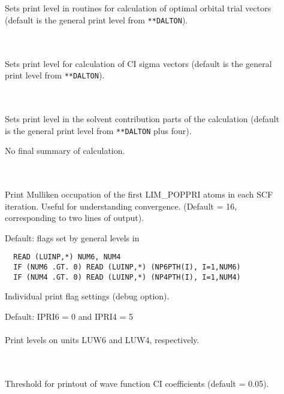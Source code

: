 \begin{description}
\item[] \ \\
   \\
  Sets print level in routines for calculation of optimal orbital trial vectors
  (default is the general print level from \verb|**DALTON|).

\item[] \ \\
   \\
  Sets print level for calculation of CI sigma vectors
  (default is the general print level from \verb|**DALTON|).

\item[] \ \\
   \\
  Sets print level in the solvent contribution parts of the calculation
  (default is the general print level from \verb|**DALTON| plus four).

\item[]
  No final summary of calculation.

\item[] \ \\
   \\
  Print Mulliken occupation of the first LIM\_POPPRI atoms in
  each SCF iteration. Useful for understanding convergence.
  (Default = 16, corresponding to two lines of output).

\item[]
 Default: flags set by general levels in 
\begin{verbatim}
  READ (LUINP,*) NUM6, NUM4
  IF (NUM6 .GT. 0) READ (LUINP,*) (NP6PTH(I), I=1,NUM6)
  IF (NUM4 .GT. 0) READ (LUINP,*) (NP4PTH(I), I=1,NUM4)
\end{verbatim}
  Individual print flag settings (debug option).

\item[]
  Default: IPRI6 = 0 and IPRI4 = 5 \\
   \\
  Print levels on units LUW6 and LUW4, respectively.
%
%
\item[] \ \\
   \\
  Threshold for printout of wave function CI coefficients (default = 0.05).
 \end{description}



